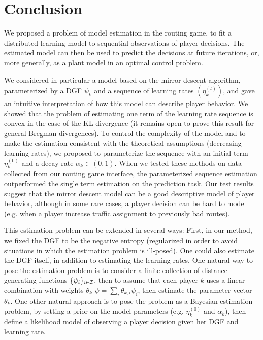 \documentclass{sig-alternate-ipsn13}
\begin{document}

\section{Conclusion}
\label{sec:conclusion}
We proposed a problem of model estimation in the routing game, to fit a distributed learning model to sequential observations of player decisions. The estimated model can then be used to predict the decisions at future iterations, or, more generally, as a plant model in an optimal control problem.

We considered in particular a model based on the mirror descent algorithm, parameterized by a DGF $\psi_k$ and a sequence of learning rates $(\eta^{(t)}_k)$, and gave an intuitive interpretation of how this model can describe player behavior. We showed that the problem of estimating one term of the learning rate sequence is convex in the case of the KL divergence (it remains open to prove this result for general Bregman divergences). To control the complexity of the model and to make the estimation consistent with the theoretical assumptions (decreasing learning rates), we proposed to parameterize the sequence with an initial term $\eta_k^{(0)}$ and a decay rate $\alpha_k \in (0, 1)$. When we tested these methods on data collected from our routing game interface, the parameterized sequence estimation outperformed the single term estimation on the prediction task. Our test results suggest that the mirror descent model can be a good descriptive model of player behavior, although in some rare cases, a player decision can be hard to model (e.g. when a player increase traffic assignment to previously bad routes).

This estimation problem can be extended in several ways: First, in our method, we fixed the DGF to be the negative entropy (regularized in order to avoid situations in which the estimation problem is ill-posed). One could also estimate the DGF itself, in addition to estimating the learning rates. One natural way to pose the estimation problem is to consider a finite collection of distance generating functions $\{\psi_i\}_{i \in \mathcal{I}}$, then to assume that each player $k$ uses a linear combination with weights $\theta_k$ $\psi = \sum_{i} \theta_{k, i} \psi_i$, then estimate the parameter vector $\theta_k$. One other natural approach is to pose the problem as a Bayesian estimation problem, by setting a prior on the model parameters (e.g. $\eta^{(0)}_k$ and $\alpha_k$), then define a likelihood model of observing a player decision given her DGF and learning rate.
\end{document}
